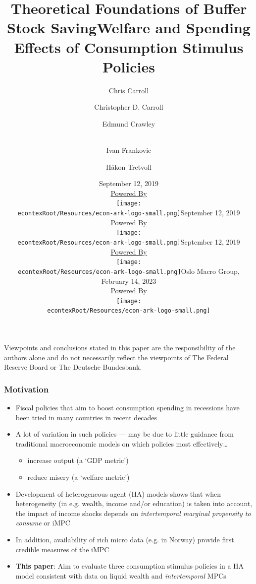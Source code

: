 \documentclass[pdflatex,aspectratio=169]{beamer}
\title[Buffer Stock Theory]{Theoretical Foundations of Buffer Stock Saving}
\author[Carroll]{Chris Carroll}
\institute[JHU]{Johns Hopkins University}
\date[\today]{September 12, 2019  \\ \medskip \medskip \medskip \href{https://econ-ark.org/}{\small Powered By} \\ \texttt{[image: \\econtexRoot/Resources/econ-ark-logo-small.png]}}
\title[Stimulus]{Welfare and Spending Effects of Consumption Stimulus Policies}
\author{
  Christopher D. Carroll
  \and
  Edmund Crawley
  \and \\
  Ivan Frankovic
  \and
  H{\aa}kon Tretvoll
}
\date[\today]{September 12, 2019  \\ \medskip \medskip \medskip \href{https://econ-ark.org/}{\small Powered By} \\ \texttt{[image: \\econtexRoot/Resources/econ-ark-logo-small.png]}}
\date[\today]{September 12, 2019  \\ \medskip \medskip \medskip \href{https://econ-ark.org/}{\small Powered By} \\ \texttt{[image: \\econtexRoot/Resources/econ-ark-logo-small.png]}}
\date[\today]{Oslo Macro Group, February 14, 2023  \\ \medskip \medskip \medskip 
	\href{https://econ-ark.org/}{\small Powered By} \\ \texttt{[image: \\econtexRoot/Resources/econ-ark-logo-small.png]}}
\begin{document}


\begin{frame}[plain]
  \titlepage

\footnotesize{Viewpoints and conclusions stated in this paper are the responsibility of the authors alone and do not necessarily reflect the viewpoints of The Federal Reserve Board or The Deutsche Bundesbank.}
\end{frame}




	
	
\begin{frame}
\frametitle{Motivation}
\begin{itemize}
	\itemsep = .5\bigskipamount 
	\item Fiscal policies that aim to boost consumption spending in recessions have been tried in many countries in recent decades 
	\item A lot of variation in such policies --- may be due to little guidance from traditional macroeconomic models on which policies most effectively\ldots 
		\begin{itemize}
		\itemsep = .25\bigskipamount 
		\item increase output (a `GDP metric')
		\item reduce misery (a `welfare metric')
		\end{itemize}
	\item Development of heterogeneous agent (HA) models shows that when heterogeneity (in e.g. wealth, income and/or education) is taken into account, the impact of income shocks depends on \textit{intertemporal marginal propensity to consume} or iMPC 
	\item In addition, availability of rich micro data (e.g. in Norway) provide first credible measures of the iMPC 
	\item \textbf{This paper}: Aim to evaluate three consumption stimulus policies in a HA model consistent with data on liquid wealth and \textit{intertemporal} MPCs 
\end{itemize}
\end{frame}
\end{document}
